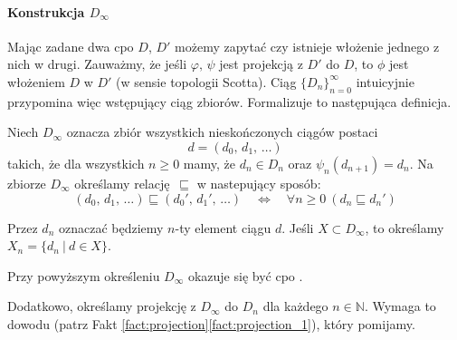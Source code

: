 \paragraph{Konstrukcja \(D_\infty\)}

Mając zadane dwa cpo \(D\), \(D'\) możemy zapytać czy istnieje włożenie jednego z nich w drugi. Zauważmy, że jeśli \(\varphi,\,\psi\) jest projekcją z \(D'\) do \(D\), to \(\phi\) jest włożeniem \(D\) w \(D'\) (w sensie topologii Scotta). Ciąg \(\{D_n\}_{n=0}^\infty\) intuicyjnie przypomina więc wstępujący ciąg zbiorów. Formalizuje to następująca definicja.


\begin{definicja}%
Niech \(D_\infty\) oznacza zbiór wszystkich nieskończonych ciągów postaci
\[
d=(d_0,\,d_1,\,\dots)
\]
takich, że dla wszystkich \(n\geq 0\) mamy, że \(d_n\in D_n\) oraz \(\psi_n (d_{n+1}) = d_n\). 
Na zbiorze \(D_\infty\) określamy relację \(\sqsubseteq\) w nastepujący sposób:
\[
(d_0,\,d_1,\,\dots) \sqsubseteq (d_0',\,d_1',\,\dots) \quad \Leftrightarrow\quad  \forall n\geq 0\  (d_n\sqsubseteq d_n') 
\]

  Przez \(d_n\) oznaczać będziemy \(n\)-ty element ciągu \(d\). Jeśli \(X\subset D_\infty\), to określamy \(X_n=\{ d_n\ |\ d\in X\}\).

\end{definicja}

Przy powyższym określeniu \(D_\infty\) okazuje się być cpo \cite[Tw. 16.36]{Hindley:2008:LCI:1388400}.


Dodatkowo, określamy projekcję z \(D_\infty\) do \(D_n\) dla każdego \(n\in\mathbb{N}\).
Wymaga to dowodu (patrz Fakt \ref{fact:projection}\ref{fact:projection_1}), który pomijamy.

